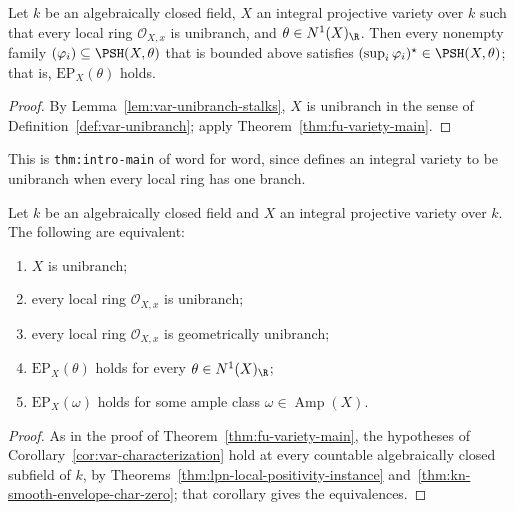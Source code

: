 \begin{theorem}
\label{thm:fu-variety-main-stalks}
\leanok
Let $k$ be an algebraically closed field, $X$ an integral projective variety over
$k$ such that every local ring $\mathcal O_{X,x}$ is unibranch, and
$\theta\in N^1(X)_\R$. Then every nonempty family
$(\varphi_i)\subseteq\PSH(X,\theta)$ that is bounded above satisfies
$(\sup_i\varphi_i)^\star\in\PSH(X,\theta)$; that is, $\mathrm{EP}_X(\theta)$
holds.
\end{theorem}
\begin{proof}
By Lemma~\ref{lem:var-unibranch-stalks}, $X$ is unibranch in the sense of
Definition~\ref{def:var-unibranch}; apply Theorem~\ref{thm:fu-variety-main}.
\end{proof}

This is \texttt{thm:intro-main} of \cite{FHX} word for word, since
\cite[\S1.1]{FHX} defines an integral variety to be unibranch when every local
ring has one branch.

\begin{corollary}
\label{cor:fu-variety-characterization}
\leanok
Let $k$ be an algebraically closed field and $X$ an integral projective variety
over $k$. The following are equivalent:
\begin{enumerate}
\item $X$ is unibranch;
\item[(1$'$)] every local ring $\mathcal O_{X,x}$ is unibranch;
\item[(1$''$)] every local ring $\mathcal O_{X,x}$ is geometrically unibranch;
\item[(2)] $\mathrm{EP}_X(\theta)$ holds for every $\theta\in N^1(X)_\R$;
\item[(3)] $\mathrm{EP}_X(\omega)$ holds for some ample class $\omega\in\operatorname{Amp}(X)$.
\end{enumerate}
\end{corollary}
\begin{proof}
As in the proof of Theorem~\ref{thm:fu-variety-main}, the hypotheses of
Corollary~\ref{cor:var-characterization} hold at every countable algebraically
closed subfield of $k$, by Theorems~\ref{thm:lpn-local-positivity-instance}
and~\ref{thm:kn-smooth-envelope-char-zero}; that corollary gives the
equivalences.
\end{proof}

